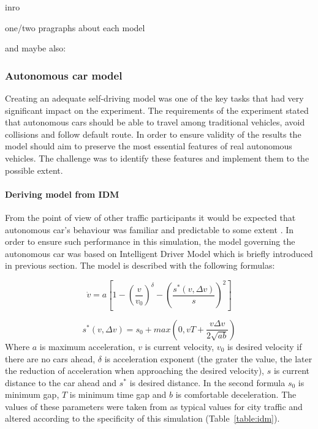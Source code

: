\documentclass[11pt,english]{article}
\begin{document}
inro


one/two pragraphs about each model


\citep{treiber2013traffic}

and maybe also:

\citep{rothery1992car}


\subsubsection{Autonomous car model}


Creating an adequate self-driving model was one of the key tasks that had very significant impact on the experiment. The requirements of the experiment stated that autonomous cars should be able to travel among traditional vehicles, avoid collisions and follow default route. In order to ensure validity of the results the model should aim to preserve the most essential features of real autonomous vehicles. The challenge was to identify these features and implement them to the possible extent. 

\paragraph{Deriving model from IDM}%
From the point of view of other traffic participants it would be expected that autonomous car's behaviour was familiar and predictable to some extent \citep{sivak2015road}. In order to ensure such performance in this simulation, the model governing the autonomous car was based on Intelligent Driver Model which is briefly introduced in previous section. The model is described with the following formulas:



\begin{equation}
\dot{v}=a\left[1-\left(\frac{v}{v_0}\right)^{\delta}-\left(\frac{s^{*}\left ( v,\Delta v \right )}{s}\right)^{2}\right]
\end{equation}

\begin{equation}
s^{*}\left ( v,\Delta v \right )=s_0+max\left ( 0,vT+\frac{v\Delta v}{2 \sqrt{ab}} \right )
\end{equation}
Where $a$ is maximum acceleration, $v$ is current velocity, $v_0$ is desired velocity if there are no cars ahead, $\delta$ is acceleration exponent (the grater the value, the later the reduction of acceleration when approaching  the desired velocity), $s$ is current distance to the car ahead and  $s^{*}$ is desired distance.
In the second formula $s_0$ is minimum gap, $T$ is minimum time gap and $b$ is comfortable deceleration. The values of these parameters were taken from \citet{sivak2015road} as typical values for city traffic and altered according to the specificity of this simulation (Table~\ref{table:idm}).
\end{document}
